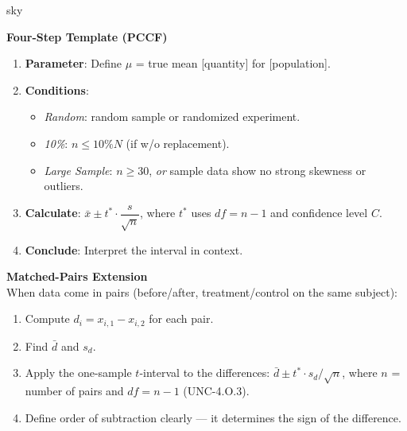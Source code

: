 \documentclass[10pt]{article}
\begin{document}
\begin{skillbox}{sky}
\begin{minipage}[t]{0.48\linewidth}
    \textbf{Four-Step Template (PCCF)}
    \begin{enumerate}
        \item \textbf{Parameter}: Define $\mu$ = true mean [quantity] for [population].
        \item \textbf{Conditions}:
              \begin{itemize}
                  \item \textit{Random}: random sample or randomized experiment.
                  \item \textit{10\%}: $n \le 10\% N$ (if w/o replacement).
                  \item \textit{Large Sample}: $n \ge 30$, \emph{or} sample data show
                        no strong skewness or outliers.
              \end{itemize}
        \item \textbf{Calculate}: $\bar x \pm t^* \cdot \dfrac{s}{\sqrt{n}}$,
              where $t^*$ uses $df = n-1$ and confidence level $C$.
        \item \textbf{Conclude}: Interpret the interval in context.
    \end{enumerate}
\end{minipage}
\hfill
\begin{minipage}[t]{0.48\linewidth}
    \textbf{Matched-Pairs Extension}\\
    When data come in pairs (before/after, treatment/control on the same subject):
    \begin{enumerate}
        \item Compute $d_i = x_{i,1} - x_{i,2}$ for each pair.
        \item Find $\bar d$ and $s_d$.
        \item Apply the one-sample $t$-interval to the differences:
              $\bar d \pm t^* \cdot s_d/\sqrt{n}$, where $n$ = number of pairs
              and $df = n - 1$ (UNC-4.O.3).
        \item Define order of subtraction clearly --- it determines the sign of
              the difference.
    \end{enumerate}
\end{minipage}
\end{skillbox}
\end{document}
